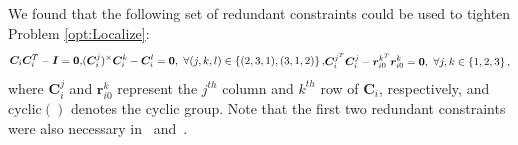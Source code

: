 \documentclass[lettersize,journal]{IEEEtran}
\begin{document}
We found that the following set of redundant constraints could be used to tighten Problem \eqref{opt:Localize}:
\begin{subequations}\label{eqn:so3_constraints}
	\begin{flalign}
		\bm{C}_i \bm{C}_i^T - \bm{I} = \bm{0},
	\end{flalign}
	\vspace*{-20pt}
	\begin{flalign}
		(\bm{C}_i^{j})^\times\bm{C}_i^{k} - \bm{C}_i^{l} = \bm{0}, ~\forall (j,k,l)\in \left\{(2,3,1), (3,1,2)\right\},
	\end{flalign}
	\vspace*{-20pt}
	\begin{flalign}
		\bm{C}_i^{j^T}\bm{C}_i^{j} - \bm{r}_{i0}^{k^T}\bm{r}_{i0}^{k} = \bm{0}, ~\forall j,k\in \left\{1,2,3\right\},
	\end{flalign}
\end{subequations}
where $\bm{C}_i^{j}$ and $\bm{r}_{i0}^{k}$ represent the $j^{th}$ column and $k^{th}$ row of $\bm{C}_i$, respectively, and $\mbox{cyclic}()$ denotes the cyclic group. Note that the first two redundant constraints were also necessary in~\cite{brialesConvexGlobal3D2017} and~\cite{wiseCertifiablyOptimalMonocular2020}. 
\end{document}
